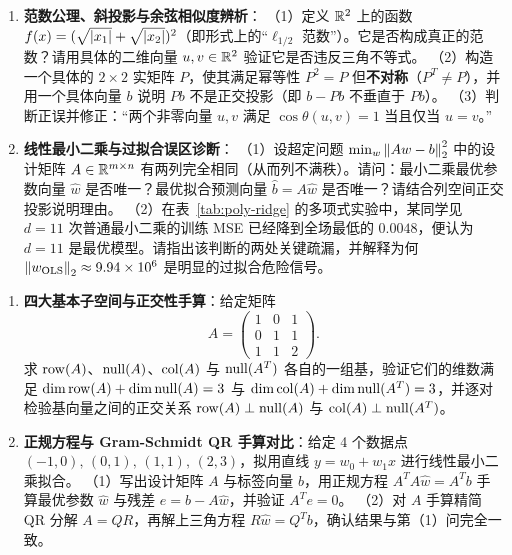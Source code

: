 \begin{enumerate}[label=\textbf{2.\arabic*}]
  \item \textbf{范数公理、斜投影与余弦相似度辨析}：
  （1）定义 $\mathbb{R}^2$ 上的函数 $f(x) = (\sqrt{\left|x_1\right|} + \sqrt{\left|x_2\right|})^2$（即形式上的“$\ell_{1/2}$ 范数”）。它是否构成真正的范数？请用具体的二维向量 $u, v \in \mathbb{R}^2$ 验证它是否违反三角不等式。
  （2）构造一个具体的 $2 \times 2$ 实矩阵 $P$，使其满足幂等性 $P^2 = P$ 但\textbf{不对称}（$P^T \neq P$），并用一个具体向量 $b$ 说明 $Pb$ 不是正交投影（即 $b - Pb$ 不垂直于 $Pb$）。
  （3）判断正误并修正：“两个非零向量 $u, v$ 满足 $\cos\theta(u, v) = 1$ 当且仅当 $u = v$。”

  \item \textbf{线性最小二乘与过拟合误区诊断}：
  （1）设超定问题 $\min_w \left\|Aw - b\right\|_2^2$ 中的设计矩阵 $A \in \mathbb{R}^{m \times n}$ 有两列完全相同（从而列不满秩）。请问：最小二乘最优参数向量 $\hat{w}$ 是否唯一？最优拟合预测向量 $\hat{b} = A\hat{w}$ 是否唯一？请结合列空间正交投影说明理由。
  （2）在表~\ref{tab:poly-ridge} 的多项式实验中，某同学见 $d = 11$ 次普通最小二乘的训练 MSE 已经降到全场最低的 $0.0048$，便认为 $d=11$ 是最优模型。请指出该判断的两处关键疏漏，并解释为何 $\left\|w_{\text{OLS}}\right\|_2 \approx 9.94 \times 10^6$ 是明显的过拟合危险信号。
\end{enumerate}


\begin{enumerate}[label=\textbf{2.\arabic*}, resume]
  \item \textbf{四大基本子空间与正交性手算}：给定矩阵
  \[
  A = \begin{pmatrix} 1 & 0 & 1 \\ 0 & 1 & 1 \\ 1 & 1 & 2 \end{pmatrix}.
  \]
  求 $\operatorname{row}(A)$、$\operatorname{null}(A)$、$\operatorname{col}(A)$ 与 $\operatorname{null}(A^T)$ 各自的一组基，验证它们的维数满足 $\dim\operatorname{row}(A) + \dim\operatorname{null}(A) = 3$ 与 $\dim\operatorname{col}(A) + \dim\operatorname{null}(A^T) = 3$，并逐对检验基向量之间的正交关系 $\operatorname{row}(A) \perp \operatorname{null}(A)$ 与 $\operatorname{col}(A) \perp \operatorname{null}(A^T)$。

  \item \textbf{正规方程与 Gram-Schmidt QR 手算对比}：给定 4 个数据点 $(-1, 0),\, (0, 1),\, (1, 1),\, (2, 3)$，拟用直线 $y = w_0 + w_1 x$ 进行线性最小二乘拟合。
  （1）写出设计矩阵 $A$ 与标签向量 $b$，用正规方程 $A^T A \hat{w} = A^T b$ 手算最优参数 $\hat{w}$ 与残差 $e = b - A\hat{w}$，并验证 $A^T e = 0$。
  （2）对 $A$ 手算精简 QR 分解 $A = QR$，再解上三角方程 $R\hat{w} = Q^T b$，确认结果与第（1）问完全一致。
\end{enumerate}

